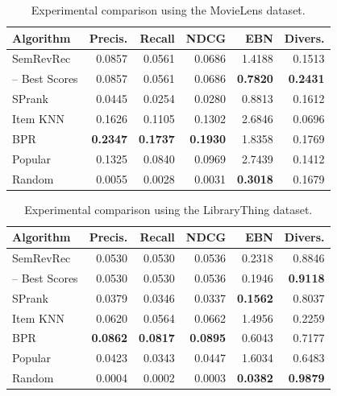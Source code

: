 \begin{table}
\centering
\begin{tabular}{@{}lrrrrr@{}}
\toprule
Algorithm & Precis. & Recall & NDCG   & EBN    & Divers. \\ \midrule
SemRevRec & 0.0857  & 0.0561 & 0.0686 & 1.4188 & 0.1513 \\
-- Best Scores & 0.0857 & 0.0561 & 0.0686 & \textbf{0.7820} & \textbf{0.2431} \\ \midrule
SPrank    & 0.0445  & 0.0254 & 0.0280 & 0.8813 & 0.1612 \\
Item KNN  & 0.1626  & 0.1105 & 0.1302 & 2.6846 & 0.0696 \\
BPR       & \textbf{0.2347}  & \textbf{0.1737} & \textbf{0.1930} & 1.8358 & 0.1769 \\
Popular   & 0.1325  & 0.0840 & 0.0969 & 2.7439 & 0.1412 \\
Random    & 0.0055  & 0.0028 & 0.0031 & \textbf{0.3018} & 0.1679 \\ \bottomrule
\end{tabular}
\caption[Comparison using the MovieLens dataset]{Experimental comparison using the MovieLens dataset.}
\label{srr:tab:ex2-ml}
\end{table}

\begin{table}
\centering
\begin{tabular}{@{}lrrrrr@{}}
\toprule
Algorithm & Precis. & Recall & NDCG   & EBN    & Divers. \\ \midrule
SemRevRec & 0.0530  & 0.0530 & 0.0536 & 0.2318 & 0.8846 \\
-- Best Scores & 0.0530  & 0.0530 & 0.0536 & 0.1946 & \textbf{0.9118} \\ \midrule
SPrank    & 0.0379  & 0.0346 & 0.0337 & \textbf{0.1562} & 0.8037 \\
Item KNN  & 0.0620  & 0.0564 & 0.0662 & 1.4956 & 0.2259 \\
BPR       & \textbf{0.0862}  & \textbf{0.0817} & \textbf{0.0895} & 0.6043 & 0.7177 \\
Popular   & 0.0423  & 0.0343 & 0.0447 & 1.6034 & 0.6483 \\
Random    & 0.0004  & 0.0002 & 0.0003 & \textbf{0.0382} & \textbf{0.9879} \\ \bottomrule
\end{tabular}
\caption[Comparison using the LibraryThing dataset]{Experimental comparison using the LibraryThing dataset.}
\label{srr:tab:ex2-lt}
\end{table}

